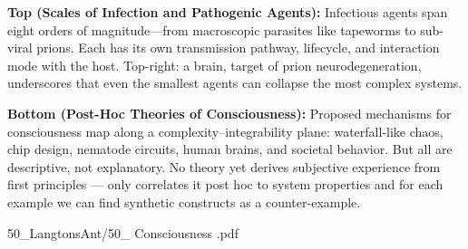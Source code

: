 \begin{SideNotePage}{
  \textbf{Top (Scales of Infection and Pathogenic Agents):}  
  Infectious agents span eight orders of magnitude—from macroscopic parasites like tapeworms to sub-viral prions. Each has its own transmission pathway, lifecycle, and interaction mode with the host. Top-right: a brain, target of prion neurodegeneration, underscores that even the smallest agents can collapse the most complex systems. \par

  \textbf{Bottom (Post-Hoc Theories of Consciousness):}  
  Proposed mechanisms for consciousness map along a complexity–integrability plane: waterfall-like chaos, chip design, nematode circuits, human brains, and societal behavior. But all are descriptive, not explanatory. No theory yet derives subjective experience from first principles — only correlates it post hoc to system properties and for each example we can find synthetic constructs as a counter-example. \par
}{50_LangtonsAnt/50_ Consciousness .pdf}
\end{SideNotePage}

